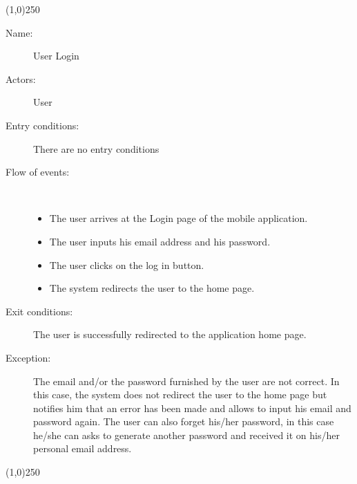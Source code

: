 \begin{center}
\line(1,0){250}
\end{center}

\begin{description}
	\item[Name:] User Login
	\item[Actors:] User
	\item[Entry conditions:] There are no entry conditions
	\item[Flow of events:]  \ \\
		\begin{itemize}
			\item The user arrives at the Login page of the mobile application.
			\item The user inputs his email address and his password.
			\item The user clicks on the log in button.
			\item The system redirects the user to the home page.
		\end{itemize}
	\item[Exit conditions:] The user is successfully redirected to the application home page.
	\item [Exception:] The email and/or the password furnished by the user are not correct. In this case, the system does not redirect the user to the home page but notifies him that an error has been made and allows to input his email and password again. The user can also forget his/her password, in this case he/she can asks to generate another password and received it on his/her personal email address.
\end{description}

\begin{center}
\line(1,0){250}
\end{center}

